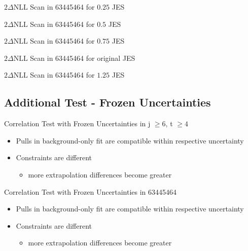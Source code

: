 \begin{frame}{$2\Delta \text{NLL}$ Scan in 63445464 for $\num[round-precision=2]{0.25}$ JES}
\end{frame}

\begin{frame}{$2\Delta \text{NLL}$ Scan in 63445464 for $\num[round-precision=2]{0.5}$ JES}
\end{frame}

\begin{frame}{$2\Delta \text{NLL}$ Scan in 63445464 for $\num[round-precision=2]{0.75}$ JES}
\end{frame}

\begin{frame}{$2\Delta \text{NLL}$ Scan in 63445464 for original JES}
\end{frame}

\begin{frame}{$2\Delta \text{NLL}$ Scan in 63445464 for $\num[round-precision=2]{1.25}$ JES}
\end{frame}

\subsection{Additional Test - Frozen Uncertainties}
\begin{frame}{Correlation Test with Frozen Uncertainties in j $\geq 6$, t $\geq 4$}

\begin{itemize}
\item Pulls in background-only fit are compatible within respective uncertainty\\
\item Constraints are different
\begin{itemize}
\item more extrapolation \rar differences become greater

\end{itemize}
\end{itemize}
\end{frame}


\begin{frame}{Correlation Test with Frozen Uncertainties in 63445464}

\begin{itemize}
\item Pulls in background-only fit are compatible within respective uncertainty\\
\item Constraints are different
\begin{itemize}
\item more extrapolation \rar differences become greater

\end{itemize}
\end{itemize}
\end{frame}